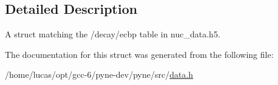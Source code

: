 \subsection{Detailed Description}
A struct matching the \textquotesingle{}/decay/ecbp\textquotesingle{} table in nuc\+\_\+data.\+h5. 

The documentation for this struct was generated from the following file\+:\begin{DoxyCompactItemize}
\item 
/home/lucas/opt/gcc-\/6/pyne-\/dev/pyne/src/\hyperlink{data_8h}{data.\+h}\end{DoxyCompactItemize}
